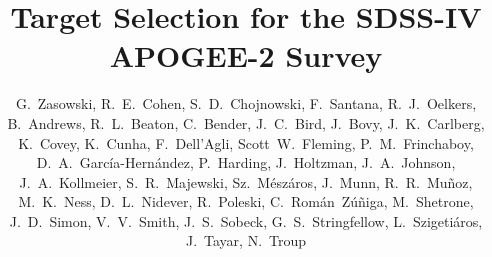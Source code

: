 \documentclass[12pt,twocolumn]{emulateapj}
\begin{document}
 

\title{Target Selection for the SDSS-IV APOGEE-2 Survey} 

\author{
G.~Zasowski, 
R.~E.~Cohen,
S.~D.~Chojnowski,
F.~Santana,
R.~J.~Oelkers, \\
B.~Andrews,
R.~L.~Beaton, 
C.~Bender, 
J.~C.~Bird, 
J.~Bovy,
J.~K.~Carlberg, 
K.~Covey, 
K.~Cunha,
F.~Dell'Agli,
Scott~W.~Fleming,
P.~M.~Frinchaboy, 
D.~A.~Garc\'{i}a-Hern\'{a}ndez,
P.~Harding,
J.~Holtzman,
J.~A.~Johnson, 
J.~A.~Kollmeier, 
S.~R.~Majewski, 
Sz.~M{\'e}sz{\'a}ros,
J.~Munn,
R.~R.~Mu\~{n}oz,
M.~K.~Ness, 
D.~L.~Nidever, 
R.~Poleski,
C.~Rom\'{a}n~Z\'{u}\~{n}iga, 
M.~Shetrone, 
J.~D.~Simon, 
V.~V.~Smith,
J.~S.~Sobeck, 
G.~S.~Stringfellow,
L.~Szigeti{\'a}ros,
J.~Tayar, 
N.~Troup 
}
\end{document}
